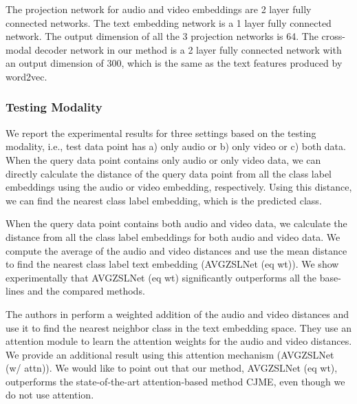\documentclass[10pt,twocolumn,letterpaper]{article}
\begin{document}
The projection network for audio and video embeddings are 2 layer fully connected networks. The text embedding network is a 1 layer fully connected network. The output dimension of all the 3 projection networks is 64. The cross-modal decoder network in our method is a 2 layer fully connected network with an output dimension of 300, which is the same as the text features produced by word2vec. 


\subsubsection{Testing Modality}\label{sec:testmod}
We report the experimental results for three settings based on the testing modality, i.e., test data point has a) only audio or b) only video or c) both data.  When the query data point contains only audio or only video data, we can directly calculate the distance of the query data point from all the class label embeddings using the audio or video embedding, respectively. Using this distance, we can find the nearest class label embedding, which is the predicted class.  

When the query data point contains both audio and video data, we calculate the distance from all the class label embeddings for both audio and video data. We compute the average of the audio and video distances and use the mean distance to find the nearest class label text embedding (AVGZSLNet (eq wt)). We show experimentally that AVGZSLNet (eq wt) significantly outperforms all the base-lines and the compared methods.  

The authors in \cite{parida2020coordinated} perform a weighted addition of the audio and video distances and use it to find the nearest neighbor class in the text embedding space. They use an attention module to learn the attention weights for the audio and video distances. We provide an additional result using this attention mechanism (AVGZSLNet (w/ attn)). We would like to point out that our method, AVGZSLNet (eq wt), outperforms the state-of-the-art attention-based method CJME, even though we do not use attention.
\end{document}
